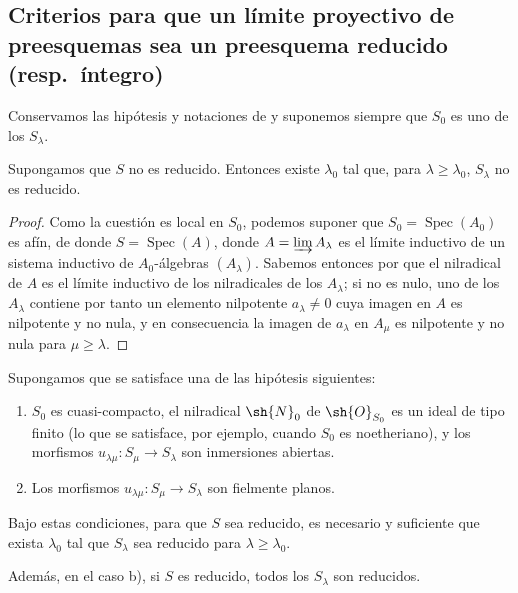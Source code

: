 \subsection{Criterios para que un límite proyectivo de preesquemas sea un preesquema reducido (resp.\ íntegro)}
\label{subsection:IV.8.7}

Conservamos las hipótesis y notaciones de  y suponemos siempre que $S_0$ es uno de los $S_\lambda$.

\begin{proposition}[8.7.1]
\label{IV.8.7.1}
Supongamos que $S$ no es reducido.
Entonces existe $\lambda_0$ tal que, para $\lambda\geqslant\lambda_0$, $S_\lambda$ no es reducido.
\end{proposition}

\begin{proof}
Como la cuestión es local en $S_0$, podemos suponer que $S_0=\operatorname{Spec}(A_0)$ es afín, de donde $S=\operatorname{Spec}(A)$, donde $A=\varinjlim A_\lambda$ es el límite inductivo de un sistema inductivo de $A_0$-álgebras $(A_\lambda)$.
Sabemos entonces por  que el nilradical de $A$ es el límite inductivo de los nilradicales de los $A_\lambda$; si no es nulo, uno de los $A_\lambda$ contiene por tanto un elemento nilpotente $a_\lambda\neq 0$ cuya imagen en $A$ es nilpotente y no nula, y en consecuencia la imagen de $a_\lambda$ en $A_\mu$ es nilpotente y no nula para $\mu\geqslant\lambda$.
\end{proof}

\begin{proposition}[8.7.2]
\label{IV.8.7.2}
Supongamos que se satisface una de las hipótesis siguientes:
\begin{enumerate}[label=\emph{\alph*)}]
\item $S_0$ es cuasi-compacto, el nilradical $\sh{N}_0$ de $\sh{O}_{S_0}$ es un ideal de tipo finito (lo que se satisface, por ejemplo, cuando $S_0$ es noetheriano), y los morfismos $u_{\lambda\mu}:S_\mu\to S_\lambda$ son inmersiones abiertas.
\item Los morfismos $u_{\lambda\mu}:S_\mu\to S_\lambda$ son fielmente planos.
\end{enumerate}
Bajo estas condiciones, para que $S$ sea reducido, es necesario y suficiente que exista $\lambda_0$ tal que $S_\lambda$ sea reducido para $\lambda\geqslant\lambda_0$.

Además, en el caso b), si $S$ es reducido, todos los $S_\lambda$ son reducidos.
\end{proposition}

